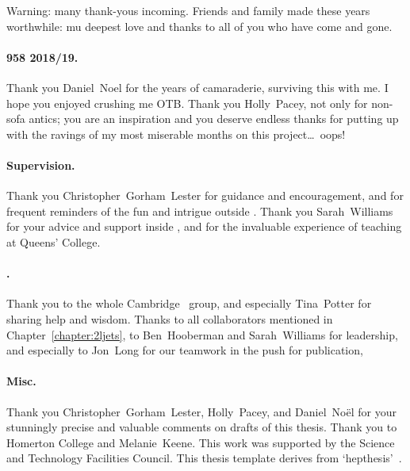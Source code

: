 \begin{acknowledgements}
Warning: many thank-yous incoming.
Friends and family made these years worthwhile:
mu deepest love and thanks to all of you who have come and gone.

\paragraph{958 2018/19.}
Thank you Daniel~Noel for the years of camaraderie, surviving this with me.
I hope you enjoyed crushing me OTB.
Thank you Holly~Pacey, not only for non-sofa antics; you are an inspiration
and you deserve endless thanks for putting up with the ravings of my most
miserable months on this project\ldots\ oops!

\paragraph{Supervision.}
Thank you Christopher~Gorham~Lester for guidance and encouragement,
and for frequent reminders of the fun and intrigue outside \atlas.
Thank you Sarah~Williams for your advice and support inside \atlas, and
for the invaluable experience of teaching at Queens' College.

\paragraph{\atlas.}
Thank you to the whole Cambridge \atlas\ group, and especially Tina~Potter for
sharing help and wisdom.
Thanks to all collaborators mentioned in Chapter~\ref{chapter:2ljets},
to Ben~Hooberman and Sarah~Williams for leadership, and especially to
Jon~Long for our teamwork in the push for publication,

\paragraph{Misc.}
Thank you Christopher~Gorham~Lester, Holly~Pacey, and Daniel~No\"el for your
stunningly precise and valuable comments on drafts of this thesis.
Thank you to Homerton College and Melanie~Keene.
This work was supported by the Science and Technology Facilities Council.
This thesis template derives from `hepthesis'~\cite{hepthesis}.
\end{acknowledgements}


